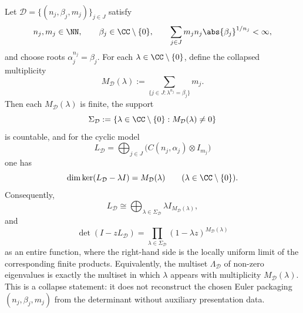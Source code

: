 \begin{proposition}
  \label{prop:collapsed-spectral-multiplicities}
  Let \(\mathcal D=\{(n_j,\beta_j,m_j)\}_{j\in J}\) satisfy
  \[
    n_j,m_j\in\NN,\qquad
    \beta_j\in\CC\setminus\{0\},\qquad
    \sum_{j\in J}m_j n_j\abs{\beta_j}^{1/n_j}<\infty,
  \]
  and choose roots \(\alpha_j^{n_j}=\beta_j\). For each
  \(\lambda\in\CC\setminus\{0\}\), define the collapsed multiplicity
  \[
    M_{\mathcal D}(\lambda)
    :=\sum_{\{j\in J:\lambda^{n_j}=\beta_j\}} m_j.
  \]
  Then each \(M_{\mathcal D}(\lambda)\) is finite, the support
  \[
    \Sigma_{\mathcal D}
    :=\{\lambda\in\CC\setminus\{0\}:M_{\mathcal D}(\lambda)\neq 0\}
  \]
  is countable, and for the cyclic model
  \[
    L_{\mathcal D}
    =\bigoplus_{j\in J}\bigl(C(n_j,\alpha_j)\otimes I_{m_j}\bigr)
  \]
  one has
  \[
    \dim\ker(L_{\mathcal D}-\lambda I)=M_{\mathcal D}(\lambda)
    \qquad (\lambda\in\CC\setminus\{0\}).
  \]
  Consequently,
  \[
    L_{\mathcal D}
    \cong \bigoplus_{\lambda\in\Sigma_{\mathcal D}}
      \lambda I_{M_{\mathcal D}(\lambda)},
  \]
  and
  \[
    \det(I-zL_{\mathcal D})
    =\prod_{\lambda\in\Sigma_{\mathcal D}}
      (1-\lambda z)^{M_{\mathcal D}(\lambda)}
  \]
  as an entire function, where the right-hand side is the locally uniform
  limit of the corresponding finite products. Equivalently, the multiset
  \(\Lambda_{\mathcal D}\) of non-zero eigenvalues is exactly the multiset
  in which \(\lambda\) appears with multiplicity \(M_{\mathcal D}(\lambda)\).
  This is a collapse statement: it does not reconstruct the chosen Euler
  packaging \((n_j,\beta_j,m_j)\) from the determinant without auxiliary
  presentation data.
\end{proposition}

